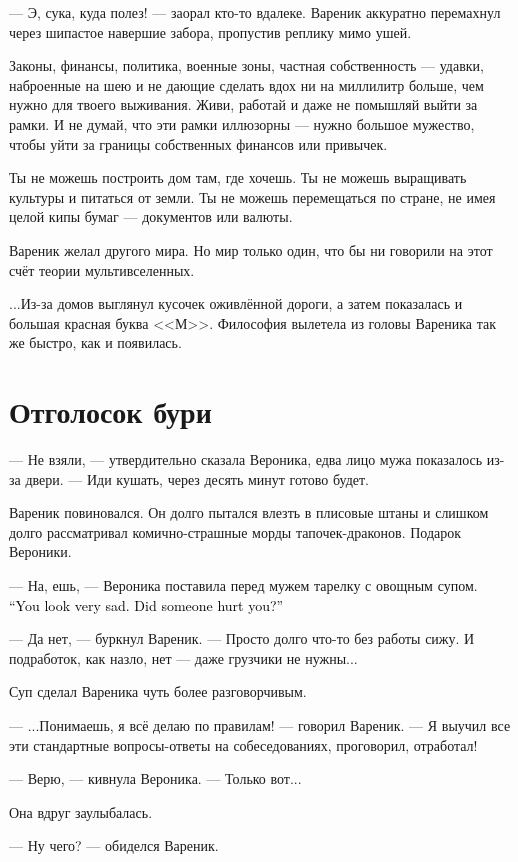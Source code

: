 \documentclass[a4paper,10pt,fleqn]{book}\usepackage{polyglossia}\setdefaultlanguage{english}\setotherlanguage{russian}\defaultfontfeatures{Ligatures=TeX,Mapping=tex-text} \usepackage{xcolor}\definecolor{lightgray}{HTML}{bbbbbb}\color{lightgray}\newcommand{\ml}[3]{\textcolor{black}{#3}}
\begin{document}
--- Э, сука, куда полез! --- заорал кто-то вдалеке.
Вареник аккуратно перемахнул через шипастое навершие забора, пропустив реплику мимо ушей.

Законы, финансы, политика, военные зоны, частная собственность --- удавки, наброенные на шею и не дающие сделать вдох ни на миллилитр больше, чем нужно для твоего выживания.
Живи, работай и даже не помышляй выйти за рамки.
И не думай, что эти рамки иллюзорны --- нужно большое мужество, чтобы уйти за границы собственных финансов или привычек.

Ты не можешь построить дом там, где хочешь.
Ты не можешь выращивать культуры и питаться от земли.
Ты не можешь перемещаться по стране, не имея целой кипы бумаг --- документов или валюты.

Вареник желал другого мира.
Но мир только один, что бы ни говорили на этот счёт теории мультивселенных.

...Из-за домов выглянул кусочек оживлённой дороги, а затем показалась и большая красная буква <<М>>.
Философия вылетела из головы Вареника так же быстро, как и появилась.

\section{Отголосок бури}

--- Не взяли, --- утвердительно сказала Вероника, едва лицо мужа показалось из-за двери.
--- Иди кушать, через десять минут готово будет.

Вареник повиновался.
Он долго пытался влезть в плисовые штаны и слишком долго рассматривал комично-страшные морды тапочек-драконов.
Подарок Вероники.

--- На, ешь, --- Вероника поставила перед мужем тарелку с овощным супом.
\ml{$0$}
{--- Ты очень грустный.}
{``You look very sad.}
\ml{$0$}
{Тебя обидел кто-то?}
{Did someone hurt you?''}

--- Да нет, --- буркнул Вареник.
--- Просто долго что-то без работы сижу.
И подработок, как назло, нет --- даже грузчики не нужны...

Суп сделал Вареника чуть более разговорчивым.

--- ...Понимаешь, я всё делаю по правилам! --- говорил Вареник.
--- Я выучил все эти стандартные вопросы-ответы на собеседованиях, проговорил, отработал!

--- Верю, --- кивнула Вероника.
--- Только вот...

Она вдруг заулыбалась.

--- Ну чего? --- обиделся Вареник.
\end{document}
